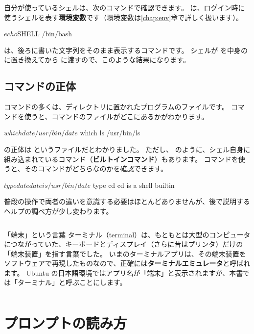 自分が使っているシェルは、次のコマンドで確認できます。
 は、ログイン時に使うシェルを表す\textbf{環境変数}です（環境変数は\ref{chap:env}章で詳しく扱います）。

\begin{terminal}[使っているシェルを確認する]
$ echo $SHELL
/bin/bash
\end{terminal}

 は、後ろに書いた文字列をそのまま表示するコマンドです。
シェルが  を中身の  に置き換えてから  に渡すので、このような結果になります。

\subsection{コマンドの正体}

コマンドの多くは、ディレクトリに置かれたプログラムのファイルです。
 コマンドを使うと、コマンドのファイルがどこにあるかがわかります。

\begin{terminal}[コマンドのファイルの場所を調べる]
$ which date
/usr/bin/date
$ which ls
/usr/bin/ls
\end{terminal}

 の正体は  というファイルだとわかりました。
ただし、 のように、シェル自身に組み込まれているコマンド（\textbf{ビルトインコマンド}）もあります。
 コマンドを使うと、そのコマンドがどちらなのかを確認できます。

\begin{terminal}[コマンドの種類を調べる]
$ type date
date is /usr/bin/date
$ type cd
cd is a shell builtin
\end{terminal}

普段の操作で両者の違いを意識する必要はほとんどありませんが、後で説明するヘルプの調べ方が少し変わります。

\begin{column}{「端末」という言葉}
  ターミナル（terminal）は、もともとは大型のコンピュータにつながっていた、キーボードとディスプレイ（さらに昔はプリンタ）だけの「端末装置」を指す言葉でした。
  いまのターミナルアプリは、その端末装置をソフトウェアで再現したものなので、正確には\textbf{ターミナルエミュレータ}と呼ばれます。
  Ubuntu の日本語環境ではアプリ名が「端末」と表示されますが、本書では「ターミナル」と呼ぶことにします。
\end{column}

\section{プロンプトの読み方}
\label{sec:terminal-prompt}

